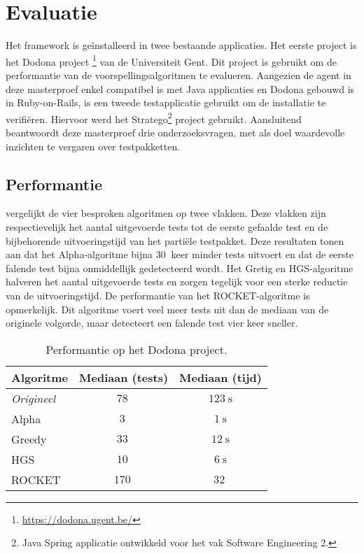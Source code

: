 \section{Evaluatie}
\noindent Het framework is ge\"installeerd in twee bestaande applicaties. Het eerste project is het Dodona project 
\footnote{\url{https://dodona.ugent.be/}} van de Universiteit Gent. Dit project is gebruikt om de performantie van de voorspellingsalgoritmen te evalueren. Aangezien de agent in deze masterproef enkel compatibel is met Java applicaties en Dodona gebouwd is in Ruby-on-Rails, is een tweede testapplicatie gebruikt om de installatie te verifi\"eren. Hiervoor werd het Stratego\footnote{Java Spring applicatie ontwikkeld voor het vak Software Engineering 2.} project gebruikt. Aansluitend beantwoordt deze masterproef drie onderzoeksvragen, met als doel waardevolle inzichten te vergaren over testpakketten.

\subsection{Performantie}
\noindent {} vergelijkt de vier besproken algoritmen op twee vlakken. Deze vlakken zijn respectievelijk het aantal uitgevoerde tests tot de eerste gefaalde test en de bijbehorende uitvoeringstijd van het parti\"ele testpakket. Deze resultaten tonen aan dat het Alpha-algoritme bijna $\SI{30}{}$ keer minder tests uitvoert en dat de eerste falende test bijna onmiddellijk gedetecteerd wordt. Het Gretig en HGS-algoritme halveren het aantal uitgevoerde tests en zorgen tegelijk voor een sterke reductie van de uitvoeringstijd. De performantie van het ROCKET-algoritme is opmerkelijk. Dit algoritme voert veel meer tests uit dan de mediaan van de originele volgorde, maar detecteert een falende test vier keer sneller.

\begin{table}[h]
	\centering
	\begin{tabularx}{\columnwidth}{|X||c|c|}
		\hline
		\textbf{Algoritme} & \textbf{Mediaan (tests)} & \textbf{Mediaan (tijd)}\\
		\hline
		\emph{Origineel} & $\SI{78}{}$ & $\SI{123}{\second}$\\
		
		\hline
		
		Alpha & $\SI{3}{}$ & $\SI{1}{\second}$\\
		
		Greedy & $\SI{33}{}$ & $\SI{12}{\second}$\\
		
		HGS & $\SI{10}{}$ & $\SI{6}{\second}$\\
		
		ROCKET & $\SI{170}{}$ & $\SI{32}{}$\\
		
		\hline
	\end{tabularx}
	\caption{Performantie op het Dodona project.}
	\label{tbl:performance-dodona}
\end{table}

